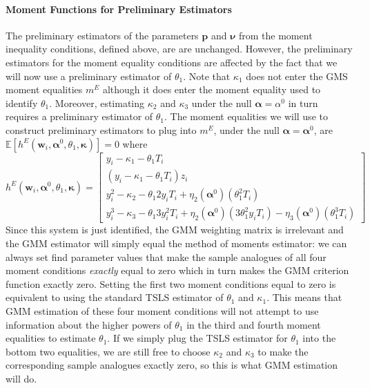 \documentclass[12pt]{article}
\begin{document}
\paragraph{Moment Functions for Preliminary Estimators}
The preliminary estimators of the parameters $\mathbf{p}$ and $\mathbf{\nu}$ from the moment inequality conditions, defined above, are are unchanged.
However, the preliminary estimators for the moment equality conditions are affected by the fact that we will now use a preliminary estimator of $\theta_1$.
Note that $\kappa_1$ does not enter the GMS moment equalities $m^E$ although it does enter the moment equality used to identify $\theta_1$.
Moreover, estimating $\kappa_2$ and $\kappa_3$ under the null $\mathbf{\alpha} = \alpha^0$ in turn requires a preliminary estimator of $\theta_1$.
The moment equalities we will use to construct preliminary estimators to plug into $m^E$, under the null $\boldsymbol{\alpha} = \boldsymbol{\alpha}^0$, are $\mathbb{E}[h^E(\mathbf{w}_i, \boldsymbol{\alpha}^0, \theta_1, \boldsymbol{\kappa})]=0$ where
\[
  h^E(\mathbf{w}_i, \boldsymbol{\alpha}^0, \theta_1, \boldsymbol{\kappa}) = 
  \left[
  \begin{array}{l}
 y_i - \kappa_1 - \theta_1 T_i\\
 (y_i - \kappa_1 - \theta_1 T_i)z_i\\
  y_i^2 - \kappa_2 - \theta_1 2y_i T_i + \eta_2(\boldsymbol{\alpha}^0) (\theta_1^2 T_i) \\
 y_i^3 - \kappa_3 - \theta_1 3 y_i^2 T_i +  \eta_2(\boldsymbol{\alpha}^0)(3\theta_1^2y_iT_i) -  \eta_3(\boldsymbol{\alpha}^0)(\theta_1^3 T_i)
  \end{array}
\right] 
\]
Since this system is just identified, the GMM weighting matrix is irrelevant and the GMM estimator will simply equal the method of moments estimator: we can always set find parameter values that make the sample analogues of all four moment conditions \emph{exactly} equal to zero which in turn makes the GMM criterion function exactly zero.
Setting the first two moment conditions equal to zero is equivalent to using the standard TSLS estimator of $\theta_1$ and $\kappa_1$.
This means that GMM estimation of these four moment conditions will not attempt to use information about the higher powers of $\theta_1$ in the third and fourth moment equalities to estimate $\theta_1$.
If we simply plug the TSLS estimator for $\theta_1$ into the bottom two equalities, we are still free to choose $\kappa_2$ and $\kappa_3$ to make the corresponding sample analogues exactly zero, so this is what GMM estimation will do.
\end{document}
